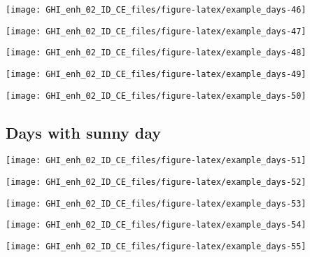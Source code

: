\documentclass[
  10pt,
  a4paper,oneside]{article}
\begin{document}
\begin{center}\texttt{[image: GHI\_enh\_02\_ID\_CE\_files/figure-latex/example\_days-46]} \end{center}

\begin{center}\texttt{[image: GHI\_enh\_02\_ID\_CE\_files/figure-latex/example\_days-47]} \end{center}

\begin{center}\texttt{[image: GHI\_enh\_02\_ID\_CE\_files/figure-latex/example\_days-48]} \end{center}

\begin{center}\texttt{[image: GHI\_enh\_02\_ID\_CE\_files/figure-latex/example\_days-49]} \end{center}

\begin{center}\texttt{[image: GHI\_enh\_02\_ID\_CE\_files/figure-latex/example\_days-50]} \end{center}

\FloatBarrier

\hypertarget{days-with-sunny-day}{%
\subsection{Days with sunny day}\label{days-with-sunny-day}}

\begin{center}\texttt{[image: GHI\_enh\_02\_ID\_CE\_files/figure-latex/example\_days-51]} \end{center}

\begin{center}\texttt{[image: GHI\_enh\_02\_ID\_CE\_files/figure-latex/example\_days-52]} \end{center}

\begin{center}\texttt{[image: GHI\_enh\_02\_ID\_CE\_files/figure-latex/example\_days-53]} \end{center}

\begin{center}\texttt{[image: GHI\_enh\_02\_ID\_CE\_files/figure-latex/example\_days-54]} \end{center}

\begin{center}\texttt{[image: GHI\_enh\_02\_ID\_CE\_files/figure-latex/example\_days-55]} \end{center}
\end{document}
